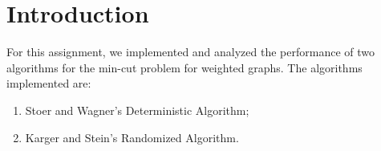 \section{Introduction}
For this assignment, we implemented and analyzed the performance of two algorithms for the min-cut problem for weighted graphs. The algorithms implemented are:
\begin{enumerate}
	\item Stoer and Wagner's Deterministic Algorithm;
	\item Karger and Stein's Randomized Algorithm.
\end{enumerate}

\pagebreak
